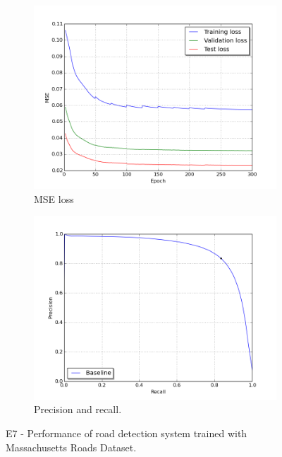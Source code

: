\begin{figure}
\begin{subfigure}{0.5\textwidth}
\includegraphics[width=\linewidth]{figs/E7/E7_lc_loss.png}
\caption{MSE loss} \label{fig:E7_performance_mass_lc}
\end{subfigure}
\hspace*{\fill} %
\begin{subfigure}{0.5\textwidth}
\includegraphics[width=\linewidth]{figs/E7/E7_pr.png}
\caption{Precision and recall.} \label{fig:E7_performance_mass_pr}
\end{subfigure}
\hspace*{\fill} %
\caption[E7 - Performance of road detection system trained with Massachusetts Roads Dataset]{E7 - Performance of road detection system trained with Massachusetts Roads Dataset.} \label{fig:E7_performance_mass}
\end{figure}

